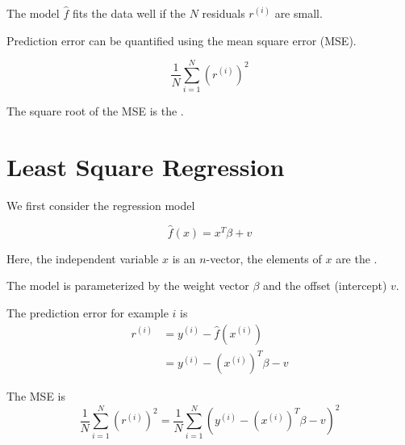 The model $ \hat{f} $ fits the data well if the $ N $ residuals $ r^{(i)} $ are small.

Prediction error can be quantified using the mean square error (MSE).

\begin{definition}
    \begin{equation}
\frac{1}{N} \sum_{i=1}^{N}\left(r^{(i)}\right)^{2}
\end{equation}
\end{definition}

The square root of the MSE is the .

\section{Least Square Regression}

We first consider the regression model

\begin{problem}
    \begin{equation}
    \hat{f}(x)=x^{T} \beta+v
    \end{equation} 

    Here, the independent variable $ x $ is an $ n $-vector, the elements of $ x $ are the .
    
\end{problem}

The model is parameterized by the weight vector $ \beta $ and the offset (intercept) $ v $.

\begin{theorem}
    The prediction error for example $ i $ is
\begin{equation}
\begin{aligned}
r^{(i)} &=y^{(i)}-\hat{f}\left(x^{(i)}\right) \\
&=y^{(i)}-\left(x^{(i)}\right)^{T} \beta-v
\end{aligned}
\end{equation}
\end{theorem}

\begin{theorem}
    The MSE is
\begin{equation}
\frac{1}{N} \sum_{i=1}^{N}\left(r^{(i)}\right)^{2}=\frac{1}{N} \sum_{i=1}^{N}\left(y^{(i)}-\left(x^{(i)}\right)^{T} \beta-v\right)^{2}
\end{equation}
\end{theorem}




